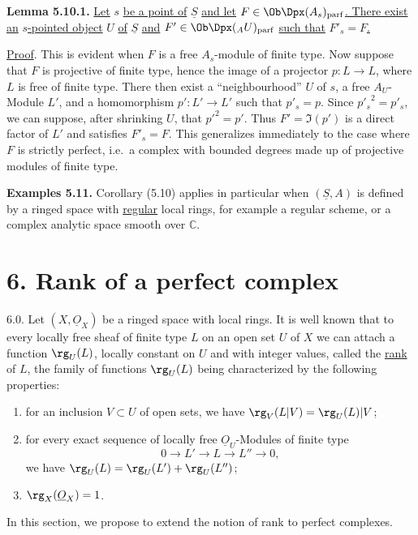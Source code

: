 \textbf{Lemma 5.10.1.} \uline{Let} \(s\) \uline{be a point of} \(\underline{S}\) \uline{and let} \(F\in\Ob\Dpx(A_s)_{\mathrm{parf}}\)\uline{. There exist an} \(s\)\uline{-pointed object} \(U\) \uline{of} \(\underline{S}\) \uline{and} \(F'\in\Ob\Dpx({}_A U)_{\mathrm{parf}}\) \uline{such that} \(F'_s=F\)\uline{.}

\uline{Proof}. This is evident when \(F\) is a free \(A_s\)-module of finite type. Now suppose that \(F\) is projective of finite type, hence the image of a projector \(p:L\longrightarrow L\), where \(L\) is free of finite type. There then exist a ``neighbourhood'' \(U\) of \(s\), a free \(A_U\)-Module \(L'\), and a homomorphism \(p':L'\to L'\) such that \(p'_s=p\). Since \({p'_s}^2=p'_s\), we can suppose, after shrinking \(U\), that \(p'^2=p'\). Thus \(F'=\Im(p')\) is a direct factor of \(L'\) and satisfies \(F'_s=F\). This generalizes immediately to the case where \(F\) is strictly perfect, i.e.\ a complex with bounded degrees made up of projective modules of finite type.

\textbf{Examples 5.11.} Corollary (5.10) applies in particular when \((\underline{S},A)\) is defined by a ringed space with \uline{regular} local rings, for example a regular scheme, or a complex analytic space smooth over \(\mathbb C\).

%
\section*{6. Rank of a perfect complex}

6.0. Let \((X,\underline{O}_X)\) be a ringed space with local rings. It is well known that to every locally free sheaf of finite type \(L\) on an open set \(U\) of \(X\) we can attach a function \(\rg_U(L)\), locally constant on \(U\) and with integer values, called the \uline{rank} of \(L\), the family of functions \(\rg_U(L)\) being characterized by the following properties:
\begin{enumerate}[label=(\roman*)]
\item for an inclusion \(V\subset U\) of open sets, we have \(\rg_V(L|V)=\rg_U(L)|V\);
\item for every exact sequence of locally free \(\underline{O}_U\)-Modules of finite type
\[
  0\longrightarrow L'\longrightarrow L\longrightarrow L''\longrightarrow 0,
\]
we have \(\rg_U(L)=\rg_U(L')+\rg_U(L'')\);
\item \(\rg_X(\underline{O}_X)=1\).
\end{enumerate}
In this section, we propose to extend the notion of rank to perfect complexes.


